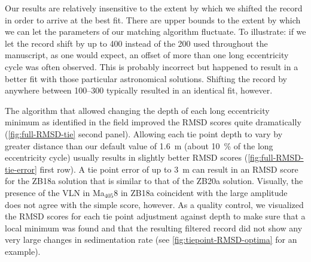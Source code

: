 \documentclass[draft]{agujournal2019}
\newcommand{\ma}[1]{Ma\(_{405}\)#1} %
\newcommand{\rez}{\textcolor{magenta}}
\newcommand{\ijk}{\textcolor{blue}}
\begin{document}
Our results are relatively insensitive to the extent by which we shifted the record in order to arrive at the best fit.
There are upper bounds to the extent by which we can let the parameters of our matching algorithm fluctuate.
To illustrate: if we let the record shift by up to \qty{400}{\kiloyear} instead of the \qty{200}{\kiloyear} used throughout the manuscript, as one would expect, an offset of more than one long eccentricity cycle was often observed.
This is probably incorrect but happened to result in a better fit with those particular astronomical solutions.
Shifting the record by anywhere between \qtyrange{100}{300}{\kiloyear} typically resulted in an identical fit, however.

The algorithm that allowed changing the depth of each long eccentricity minimum as identified in the field improved the \gls{RMSD} scores quite dramatically (\cref{fig:full-RMSD-tie} second panel).
Allowing each tie point depth to vary by greater distance than our default value of \qty{1.6}{\metre} (about \qty{10}{\percent} of the long eccentricity cycle) usually results in slightly better \gls{RMSD} scores (\cref{fig:full-RMSD-tie-error} first row).
A tie point error of up to \qty{3}{\metre} can result in an \gls{RMSD} score for the ZB18a solution that is similar to that of the ZB20a solution.
Visually, the presence of the \gls{VLN} in \ma{8} in ZB18a coincident with the large amplitude does not agree with the simple score, however.
As a quality control, we visualized the \gls{RMSD} scores for each tie point adjustment against depth to make sure that a local minimum was found and that the resulting filtered record did not show any very large changes in sedimentation rate (see \cref{fig:tiepoint-RMSD-optima} for an example).
\end{document}

